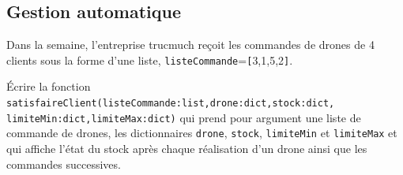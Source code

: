 \documentclass[t,10pt]{article}
\begin{document}
\subsection*{Gestion automatique}
Dans la semaine, l'entreprise trucmuch reçoit les commandes de drones de 4 clients sous la forme d'une liste, \texttt{listeCommande}=\verb![!3,1,5,2\verb!]!.

\begin{qexo}
\'Ecrire la fonction \texttt{satisfaireClient(listeCommande:list,drone:dict,stock:dict,\\
limiteMin:dict,limiteMax:dict)} qui prend pour argument une liste de commande de drones, les dictionnaires \texttt{drone}, \texttt{stock}, \texttt{limiteMin} et \texttt{limiteMax} et qui affiche l'état du stock après chaque réalisation d'un drone ainsi que les commandes successives.
\end{qexo}
\end{document}
